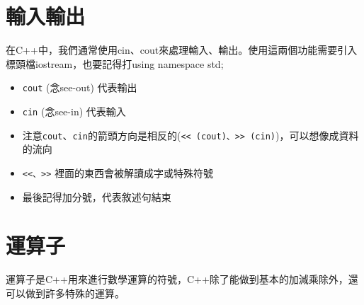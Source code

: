 \documentclass[a4paper, 11pt, oneside]{book}
\begin{document}
\section{輸入輸出}
在C++中，我們通常使用cin、cout來處理輸入、輸出。使用這兩個功能需要引入標頭檔iostream，也要記得打using namespace std;

\begin{itemize}
    \item \texttt{cout} (念see-out) 代表輸出
    \item \texttt{cin} (念see-in) 代表輸入
    \item 注意\texttt{cout}、\texttt{cin}的箭頭方向是相反的(\texttt{<< (cout)、>> (cin)})，可以想像成資料的流向
    \item \texttt{<<、>>} 裡面的東西會被解讀成字或特殊符號
    \item 最後記得加分號，代表敘述句結束
\end{itemize}

\section{運算子}
運算子是C++用來進行數學運算的符號，C++除了能做到基本的加減乘除外，還可以做到許多特殊的運算。
\end{document}
